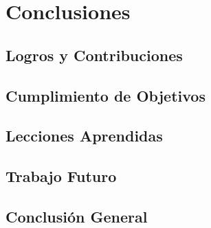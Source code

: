 
\section{Conclusiones}

\subsection{Logros y Contribuciones}

\subsection{Cumplimiento de Objetivos}

\subsection{Lecciones Aprendidas}

\subsection{Trabajo Futuro}

\subsection{Conclusión General}

